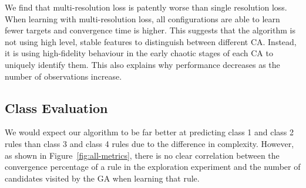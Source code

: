 \begin{table}[h!]
    \centering
    \hfill
    \hfill
    \hfill
    \hfill
    \caption{Results of learning life-like CA with multi-resolution loss.}
    \label{table:multires-loss}
\end{table}

We find that multi-resolution loss is patently worse than single resolution loss. When learning with multi-resolution loss, all configurations are able to learn fewer targets and convergence time is higher. This suggests that the algorithm is not using high level, stable features to distinguish between different CA. Instead, it is using high-fidelity behaviour in the early chaotic stages of each CA to uniquely identify them. This also explains why performance decreases as the number of observations increase.

\subsection{Class Evaluation}

We would expect our algorithm to be far better at predicting class 1 and class 2 rules than class 3 and class 4 rules due to the difference in complexity. However, as shown in Figure~\ref{fig:all-metrics}, there is no clear correlation between the convergence percentage of a rule in the exploration experiment and the number of candidates visited by the GA when learning that rule.

